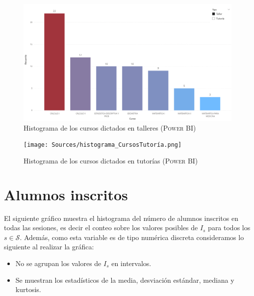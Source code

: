 \documentclass[11pt,a4paper]{book}
\theoremstyle{definition}%
\begin{document}
                \begin{figure}[H]
                    \centering
                    \includegraphics[width=1\textwidth]{Sources/histograma_CursosTaller.png}
                    \caption{Histograma de los cursos dictados en talleres (\textsc{Power BI})}
                    \label{fig:histograma_CursosTaller}
                \end{figure}
                \begin{figure}[H]
                    \centering
                    \texttt{[image: Sources/histograma\_CursosTutoría.png]}
                    \caption{Histograma de los cursos dictados en tutorías (\textsc{Power BI})}
                    \label{fig:histograma_CursosTutoría}
                \end{figure}
            \newpage
            \section{Alumnos inscritos}                
                
                El siguiente gráfico muestra el histograma del número de alumnos inscritos en todas las sesiones, es decir el conteo sobre los valores posibles de $I_s$ para todos los $s\in\mathcal{S}$. Además, como esta variable es de tipo numérica discreta consideramos lo siguiente al realizar la gráfica:
                \begin{itemize}
                    \item No se agrupan los valores de $I_s$ en intervalos.
                    \item Se muestran los estadísticos de la media, desviación estándar, mediana y kurtosis.
                \end{itemize}
                
\end{document}
